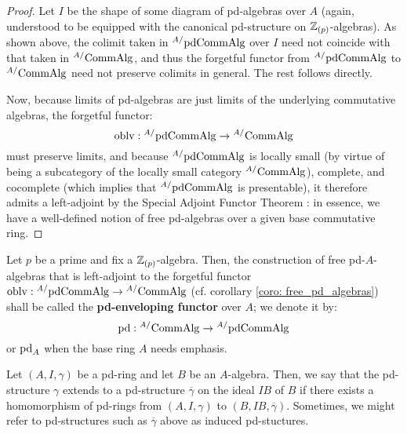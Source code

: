                     \begin{proof}
                        Let $I$ be the shape of some diagram of pd-algebras over $A$ (again, understood to be equipped with the canonical pd-structure on $\mathbb{Z}_{(p)}$-algebras). As shown above, the colimit taken in ${}^{A/}\mathrm{pd}\mathrm{Comm}\mathrm{Alg}$ over $I$ need not coincide with that taken in ${}^{A/}\mathrm{Comm}\mathrm{Alg}$, and thus the forgetful functor from ${}^{A/}\mathrm{pd}\mathrm{Comm}\mathrm{Alg}$ to ${}^{A/}\mathrm{Comm}\mathrm{Alg}$ need not preserve colimits in general. The rest follows directly. 
                        
                        Now, because limits of pd-algebras are just limits of the underlying commutative algebras, the forgetful functor:
                            $$\mathrm{oblv}: {}^{A/}\mathrm{pd}\mathrm{Comm}\mathrm{Alg} \to {}^{A/}\mathrm{Comm}\mathrm{Alg}$$
                        must preserve limits, and because ${}^{A/}\mathrm{pd}\mathrm{Comm}\mathrm{Alg}$ is locally small (by virtue of being a subcategory of the locally small category ${}^{A/}\mathrm{Comm}\mathrm{Alg}$), complete, and cocomplete (which implies that ${}^{A/}\mathrm{pd}\mathrm{Comm}\mathrm{Alg}$ is presentable), it therefore admits a left-adjoint by the Special Adjoint Functor Theorem \cite[Theorem V.8.2]{maclane}: in essence, we have a well-defined notion of free pd-algebras over a given base commutative ring.
                    \end{proof}
                    
                \begin{definition}[pd-envelopes] \label{def: pd_envelopes}
                    Let $p$ be a prime and fix a $\mathbb{Z}_{(p)}$-algebra. Then, the construction of free pd-$A$-algebras that is left-adjoint to the forgetful functor $\mathrm{oblv}: {}^{A/}\mathrm{pd}\mathrm{Comm}\mathrm{Alg} \to {}^{A/}\mathrm{Comm}\mathrm{Alg}$ (cf. corollary \ref{coro: free_pd_algebras}) shall be called the \textbf{pd-enveloping functor} over $A$; we denote it by:
                        $$\mathrm{pd}: {}^{A/}\mathrm{Comm}\mathrm{Alg} \to {}^{A/}\mathrm{pd}\mathrm{Comm}\mathrm{Alg}$$
                    or $\mathrm{pd}_A$ when the base ring $A$ needs emphasis.
                \end{definition}
                
                \begin{definition}
                    Let $(A, I, \gamma)$ be a pd-ring and let $B$ be an $A$-algebra. Then, we say that the pd-structure $\gamma$ extends to a pd-structure $\overline{\gamma}$ on the ideal $IB$ of $B$ if there exists a homomorphism of pd-rings from $(A, I, \gamma)$ to $(B, IB, \overline{\gamma})$. Sometimes, we might refer to pd-structures such as $\overline{\gamma}$ above as induced pd-stuctures. 
                \end{definition}
                
